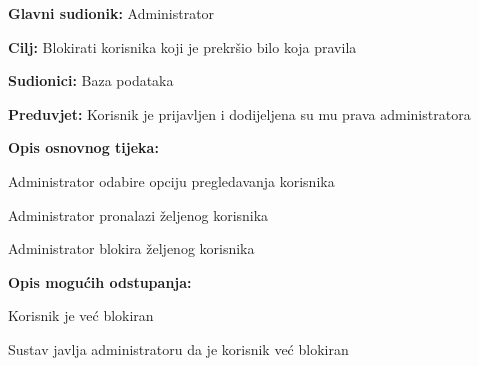 				\noindent {}
					\begin{packed_item}
	
						\item \textbf{Glavni sudionik: }Administrator
						\item  \textbf{Cilj:} Blokirati korisnika koji je prekršio bilo koja pravila
						\item  \textbf{Sudionici:} Baza podataka
						\item  \textbf{Preduvjet:} Korisnik je prijavljen i dodijeljena su mu prava administratora
						\item  \textbf{Opis osnovnog tijeka:}
						
						\item[] \begin{packed_enum}
	
							\item Administrator odabire opciju pregledavanja korisnika
							\item Administrator pronalazi željenog korisnika
							\item Administrator blokira željenog korisnika

						\end{packed_enum}
						
						\item  \textbf{Opis mogućih odstupanja:}
						
						\item[] \begin{packed_item}
	
							\item[3.a] Korisnik je već blokiran
							
								\begin{packed_item}
								
									\item Sustav javlja administratoru da je korisnik već blokiran
								
								\end{packed_item}
							
						\end{packed_item}						
					\end{packed_item}
					
